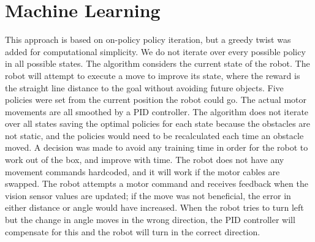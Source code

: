 \section{Machine Learning}
\label{section::learning}

This approach is based on on-policy policy iteration, but a greedy twist was added for computational simplicity. We do not iterate over every possible policy in all possible states. The algorithm considers the current state of the robot. The robot will attempt to execute a move to improve its state, where the reward is the straight line distance to the goal without avoiding future objects. Five policies were set from the current position the robot could go. The actual motor movements are all smoothed by a PID controller. The algorithm does not iterate over all states saving the optimal policies for each state because the obstacles are not static, and the policies would need to be recalculated each time an obstacle moved. A decision was made to avoid any training time in order for the robot to work out of the box, and improve with time. The robot does not have any movement commands hardcoded, and it will work if the motor cables are swapped. The robot attempts a motor command and receives feedback when the vision sensor values are updated; if the move was not beneficial, the error in either distance or angle would have increased. When the robot tries to turn left but the change in angle moves in the wrong direction, the PID controller will compensate for this and the robot will turn in the correct direction.
